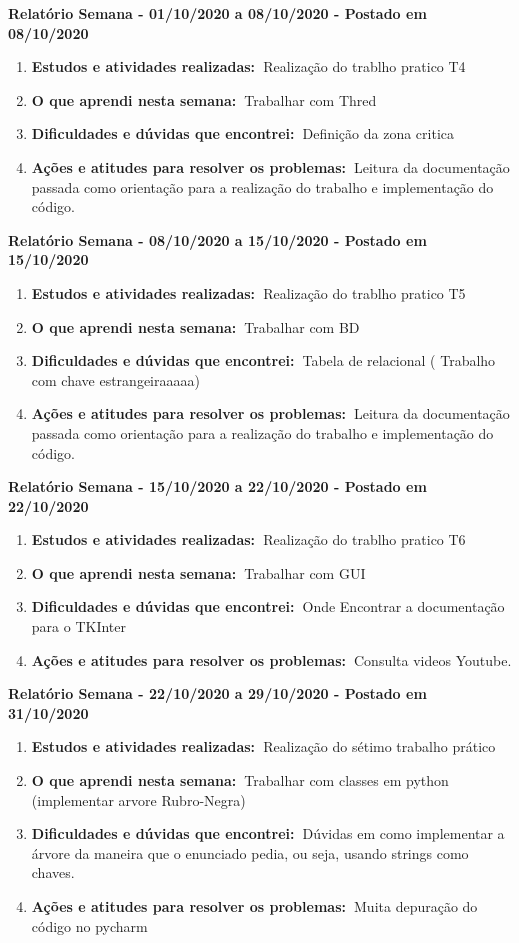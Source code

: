 \documentclass[10pt,a4paper]{report}
\newcommand{\bola}{\resizebox{12pt}{!}{$\bullet$\ }}
\newcommand{\relatorio}[3]{\vspace{3mm}\noindent\bola\textbf{Relatório Semana - #1 a #2 - Postado em #3}}
\newcommand{\atividades}{\textbf{Estudos e atividades realizadas:\ }}
\newcommand{\aprendizado}{\textbf{O que aprendi nesta semana:\ }}
\newcommand{\duvidas}{\textbf{Dificuldades e dúvidas que encontrei:\ }}
\newcommand{\acoes}{\textbf{Ações e atitudes para resolver os problemas:\ }}
\begin{document}
\relatorio{01/10/2020}{08/10/2020}{08/10/2020}
\begin{enumerate}
	\item \atividades Realização do trablho pratico T4
	
	\item \aprendizado Trabalhar com Thred
	
	\item \duvidas Definição da zona critica
	
	\item \acoes Leitura da documentação passada como orientação para a realização do trabalho e implementação do código.
\end{enumerate}

\relatorio{08/10/2020}{15/10/2020}{15/10/2020}
\begin{enumerate}
	\item \atividades Realização do trablho pratico T5
	
	\item \aprendizado Trabalhar com BD
	
	\item \duvidas Tabela de relacional ( Trabalho com chave estrangeiraaaaa)
	
	\item \acoes Leitura da documentação passada como orientação para a realização do trabalho e implementação do código.
\end{enumerate}

\relatorio{15/10/2020}{22/10/2020}{22/10/2020}
\begin{enumerate}
	\item \atividades Realização do trablho pratico T6
	
	\item \aprendizado Trabalhar com GUI
	
	\item \duvidas Onde Encontrar a documentação para o TKInter
	
	\item \acoes Consulta videos Youtube.
\end{enumerate}

\relatorio{22/10/2020}{29/10/2020}{31/10/2020}
\begin{enumerate}
    \item \atividades Realização do sétimo trabalho prático

    \item \aprendizado Trabalhar com classes em python (implementar arvore Rubro-Negra)

    \item \duvidas Dúvidas em como implementar a árvore da maneira que o enunciado pedia, ou seja, usando strings como chaves.

    \item \acoes Muita depuração do código no pycharm
\end{enumerate}
\end{document}
